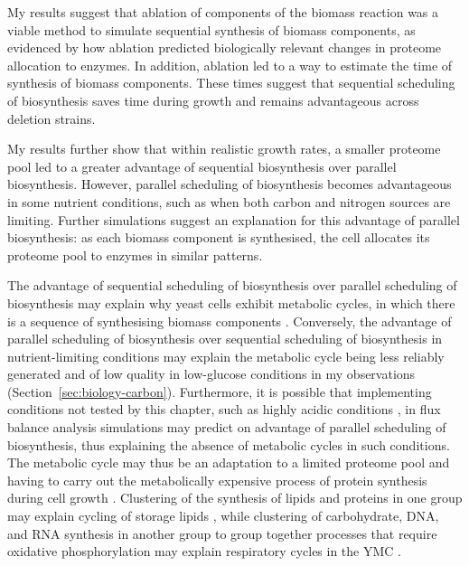 My results suggest that ablation of components of the biomass reaction was a viable method to simulate sequential synthesis of biomass components, as evidenced by how ablation predicted biologically relevant changes in proteome allocation to enzymes.
In addition, ablation led to a way to estimate the time of synthesis of biomass components.
These times suggest that sequential scheduling of biosynthesis saves time during growth and remains advantageous across deletion strains.

My results further show that within realistic growth rates, a smaller proteome pool led to a greater advantage of sequential biosynthesis over parallel biosynthesis.
However, parallel scheduling of biosynthesis becomes advantageous in some nutrient conditions, such as when both carbon and nitrogen sources are limiting.
Further simulations suggest an explanation for this advantage of parallel biosynthesis: as each biomass component is synthesised, the cell allocates its proteome pool to enzymes in similar patterns.

The advantage of sequential scheduling of biosynthesis over parallel scheduling of biosynthesis may explain why yeast cells exhibit metabolic cycles, in which there is a sequence of synthesising biomass components \parencite{mellorMolecularBasisMetabolic2016}.
Conversely, the advantage of parallel scheduling of biosynthesis over sequential scheduling of biosynthesis in nutrient-limiting conditions may explain the metabolic cycle being less reliably generated and of low quality in low-glucose conditions in my observations (Section~\ref{sec:biology-carbon}).
Furthermore, it is possible that implementing conditions not tested by this chapter, such as highly acidic conditions \parencite{oneillEukaryoticCellBiology2020}, in flux balance analysis simulations may predict on advantage of parallel scheduling of biosynthesis, thus explaining the absence of metabolic cycles in such conditions.
The metabolic cycle may thus be an adaptation to a limited proteome pool and having to carry out the metabolically expensive process of protein synthesis during cell growth \parencite{oneillEukaryoticCellBiology2020}.
Clustering of the synthesis of lipids and proteins in one group may explain cycling of storage lipids \parencite{campbellBuildingBlocksAre2020}, while clustering of carbohydrate, DNA, and RNA synthesis in another group to group together processes that require oxidative phosphorylation may explain respiratory cycles in the YMC \parencite{tuLogicYeastMetabolic2005}.

